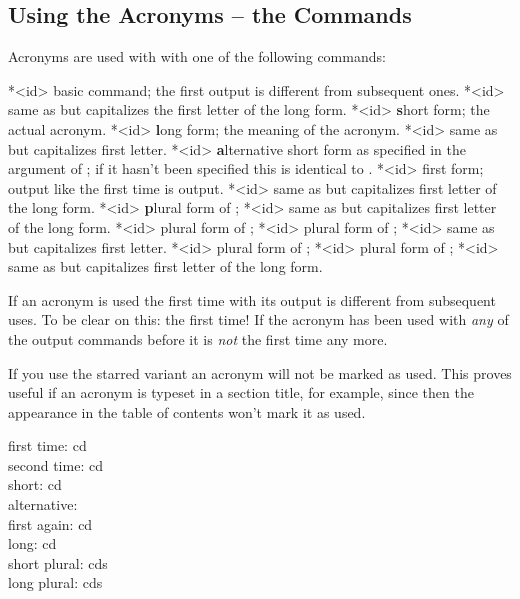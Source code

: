 \documentclass[DIV10,toc=index,toc=bib,hyperfootnotes=false]{cnpkgdoc}
\makeatletter
\newcommand*\h[1]{\textcolor{main}{\textbf{#1}}}
\newcommand*\sinceversion[1]{%
  \@bsphack
  \marginnote{%
    \footnotesize\sffamily\RaggedRight
    \textcolor{black!75}{Introduced in version~#1}}%
  \@esphack}
\makeatother
\begin{document}
\subsection{Using the Acronyms -- the Commands}
Acronyms are used with with one of the following commands:
\begin{beschreibung}
 *{<id>} basic command; the first output is different from subsequent
   ones.
 *{<id>} same as  but capitalizes the first letter of the
   long form.
 *{<id>} \h{s}hort form; the actual acronym.
 *{<id>} \h{l}ong form; the meaning of the acronym.
 *{<id>} same as  but capitalizes first letter.
 *{<id>} \h{a}lternative short form as specified in the 
   argument of ; if it hasn't been specified this is
   identical to .
 *{<id>} first form; output like the first time  is output.
 *{<id>} same as  but capitalizes first letter of the long
   form.
 *{<id>} \h{p}lural form of ;
 *{<id>} same as  but capitalizes first letter of the long
   form.
 *{<id>} plural form of ;
 *{<id>} plural form of ;
 *{<id>} same as  but capitalizes first letter.
 *{<id>} plural form of ;
 *{<id>} plural form of ;
 *{<id>} same as  but capitalizes first letter of the
   long form.
\end{beschreibung}
If an acronym is used the first time with  its output is different from
subsequent uses. To be clear on this: the first time! If the acronym has been
used with \emph{any} of the output commands before it is \emph{not} the first
time any more.

\sinceversion{0.5}If you use the starred variant an acronym will not be marked as
used. This proves useful if an acronym is typeset in a section title, for example,
since then the appearance in the table of contents won't mark it as used.

\begin{beispiel}
 first time: \ac{cd} \\
 second time: \ac{cd} \\
 short: \acs{cd} \\
 alternative:  \\
 first again: \acf{cd} \\
 long: \acl{cd} \\
 short plural: \acsp{cd} \\
 long plural: \aclp{cd}
\end{beispiel}
\end{document}

